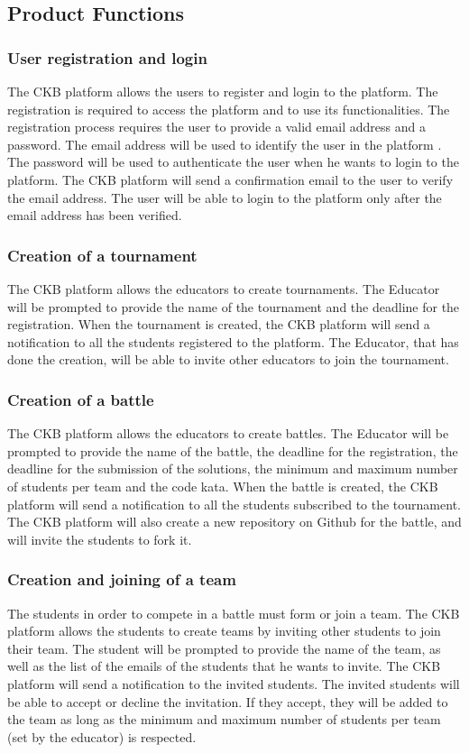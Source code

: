\subsection{Product Functions}
\subsubsection{User registration and login}
The CKB platform allows the users to register and login to the platform. The registration is required to access the platform and to use its functionalities. The registration process requires the user to provide a valid email address and a password. The email address will be used to identify the user in the platform . The password will be used to authenticate the user when he wants to login to the platform. The CKB platform will send a confirmation email to the user to verify the email address. The user will be able to login to the platform only after the email address has been verified.
\subsubsection{Creation of a tournament}
The CKB platform allows the educators to create tournaments. The Educator will be prompted to provide the name of the tournament and the deadline for the registration. When the tournament is created, the CKB platform will send a notification to all the students registered to the platform. The Educator, that has done the creation, will be able to invite other educators to join the tournament.
\subsubsection{Creation of a battle}
The CKB platform allows the educators to create battles. The Educator will be prompted to provide the name of the battle, the deadline for the registration, the deadline for the submission of the solutions, the minimum and maximum number of students per team and the code kata. When the battle is created, the CKB platform will send a notification to all the students subscribed to the tournament. The CKB platform will also create a new repository on Github for the battle, and will invite the students to fork it.
\subsubsection{Creation and joining of a team}
The students in order to compete in a battle must form or join a team. The CKB platform allows the students to create teams by inviting other students to join their team. The student will be prompted to provide the name of the team, as well as the list of the emails of the students that he wants to invite. The CKB platform will send a notification to the invited students. The invited students will be able to accept or decline the invitation. If they accept, they will be added to the team as long as the minimum and maximum number of students per team (set by the educator) is respected.

